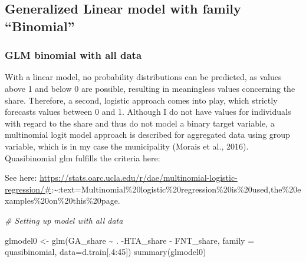 \documentclass[
]{article}
\newenvironment{Shaded}{\begin{snugshade}}{\end{snugshade}}
\newcommand{\AttributeTok}[1]{\textcolor[rgb]{0.77,0.63,0.00}{#1}}
\newcommand{\CommentTok}[1]{\textcolor[rgb]{0.56,0.35,0.01}{\textit{#1}}}
\newcommand{\DecValTok}[1]{\textcolor[rgb]{0.00,0.00,0.81}{#1}}
\newcommand{\FunctionTok}[1]{\textcolor[rgb]{0.00,0.00,0.00}{#1}}
\newcommand{\NormalTok}[1]{#1}
\newcommand{\OtherTok}[1]{\textcolor[rgb]{0.56,0.35,0.01}{#1}}
\newcommand{\SpecialCharTok}[1]{\textcolor[rgb]{0.00,0.00,0.00}{#1}}
\begin{document}
\hypertarget{generalized-linear-model-with-family-binomial}{%
\subsection{Generalized Linear model with family
``Binomial''}\label{generalized-linear-model-with-family-binomial}}

\hypertarget{glm-binomial-with-all-data}{%
\subsubsection{GLM binomial with all
data}\label{glm-binomial-with-all-data}}

With a linear model, no probability distributions can be predicted, as
values above 1 and below 0 are possible, resulting in meaningless values
concerning the share. Therefore, a second, logistic approach comes into
play, which strictly forecasts values between 0 and 1. Although I do not
have values for individuals with regard to the share and thus do not
model a binary target variable, a multinomial logit model approach is
described for aggregated data using group variable, which is in my case
the municipality (Morais et al., 2016). Quasibinomial glm fulfills the
criteria here:

See here:
\url{https://stats.oarc.ucla.edu/r/dae/multinomial-logistic-regression/\#}:\textasciitilde:text=Multinomial\%20logistic\%20regression\%20is\%20used,the\%20examples\%20on\%20this\%20page.

\begin{Shaded}
\begin{Highlighting}[]
\CommentTok{\# Setting up model with all data}

\NormalTok{glmodel0 }\OtherTok{\textless{}{-}} \FunctionTok{glm}\NormalTok{(GA\_share }\SpecialCharTok{\textasciitilde{}}\NormalTok{ . }\SpecialCharTok{{-}}\NormalTok{HTA\_share}
              \SpecialCharTok{{-}}\NormalTok{ FNT\_share, }\AttributeTok{family =}\NormalTok{ quasibinomial, }\AttributeTok{data=}\NormalTok{d.train[,}\DecValTok{4}\SpecialCharTok{:}\DecValTok{45}\NormalTok{])}
\FunctionTok{summary}\NormalTok{(glmodel0)}
\end{Highlighting}
\end{Shaded}
\end{document}
